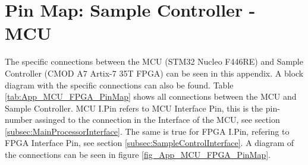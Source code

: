 \chapter{Pin Map: Sample Controller - MCU} \label{App:PinMap_MCU_FPGA}
The specific connections between the MCU (STM32 Nucleo F446RE) and Sample Controller (CMOD A7 Artix-7 35T FPGA) can be seen in this appendix. A block diagram with the specific
connections can also be found. Table \ref{tab:App_MCU_FPGA_PinMap} shows all connections between the MCU and Sample Controller. MCU I.Pin refers to MCU Interface Pin, this is the
pin-number assinged to the connection in the Interface of the MCU, see section \ref{subsec:MainProcessorInterface}. The same is true for FPGA I.Pin, refering to FPGA Interface Pin,
see section \ref{subsec:SampleControlInterface}. A diagram of the connections can be seen in figure \ref{fig_App_MCU_FPGA_PinMap}.

